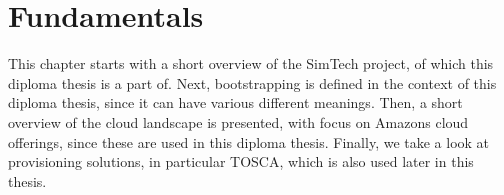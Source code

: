 \chapter{Fundamentals}
\label{fundamentals}

This chapter starts with a short overview of the SimTech project, of which this diploma thesis is a part of.
Next, bootstrapping is defined in the context of this diploma thesis, since it can have various different meanings.
Then, a short overview of the cloud landscape is presented, with focus on Amazons cloud offerings, since these are used in this diploma thesis.
Finally, we take a look at provisioning solutions, in particular TOSCA, which is also used later in this thesis.





